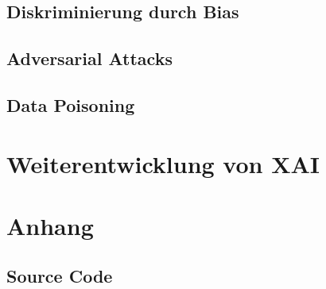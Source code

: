\documentclass[
  12pt, %
  a4paper, %
  oneside, %
  openany, 
  numbers=noenddot, %
  BCOR=5mm, %
  parskip=half*, %
  thesis, %
]{bfhbook}
\begin{document}
\section{Diskriminierung durch Bias}
\section{Adversarial Attacks}
\section{Data Poisoning}

\chapter{Weiterentwicklung von XAI}

\chapter{Anhang}
\section{Source Code}
\label{dt-vis}
\end{document}
